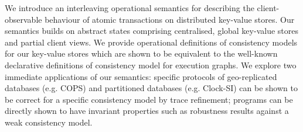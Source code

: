 
We introduce an interleaving operational semantics for describing the
client-observable behaviour of atomic transactions on distributed
key-value stores. Our semantics builds on abstract states comprising
centralised, global key-value stores and partial client views.  We provide
operational definitions of consistency models for our key-value stores which
are shown to be equivalent to the well-known declarative definitions
of consistency model for execution graphs. We explore  two
immediate applications of our semantics: specific protocols of 
geo-replicated databases (e.g. COPS) and partitioned databases
(e.g. Clock-SI) can be shown to be correct for a specific consistency
model by trace refinement; %
programs can be directly shown to have invariant properties such as 
robustness results against a weak consistency model.
